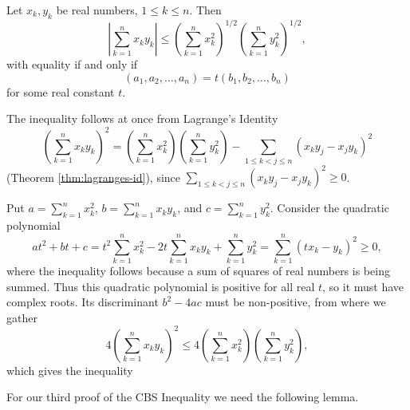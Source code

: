 \documentclass[11pt, openany]{book}
\theoremstyle{change} \theoremheaderfont{\blue\sffamily\bfseries}
\newcommand{\proofsymbol}{\Pisymbol{pzd}{113}}
\theoremstyle{nonumberplain} \theoremheaderfont{\sffamily\bfseries}
\newenvironment{f-pf}[0]{\itshape\begin{quote}{\bf First Proof: \ }}{\proofsymbol\end{quote}}
\newenvironment{s-pf}[0]{\itshape\begin{quote}{\bf Second Proof: \ }}{\proofsymbol\end{quote}}
\def\absval#1{\left| #1 \right|}
\newcommand{\dis}{\displaystyle}
\newcommand{\í}{\'{\i}}
\begin{document}
\begin{thm}\label{thm:CBS-ineq}
Let $x_k, y_k$ be real numbers, $1 \leq k \leq n$. Then
$$\absval{\sum _{k = 1} ^n x_ky_k} \leq \left(\sum _{k = 1} ^n x_k
^2 \right)^{1/2}\left(\sum _{k = 1} ^n y_k ^2 \right)^{1/2},   $$
with equality if and only if
$$(a_1,a_2,\ldots , a_n)=t(b_1,b_2,\ldots , b_n)
$$for some real constant $t$.
\end{thm}
\begin{f-pf}The inequality follows at once from Lagrange's Identity
$$ \left(\sum _{k=1} ^nx_ky_k\right)^2
=\left(\sum _{k=1} ^nx_k ^2\right)\left(\sum _{k=1} ^ny_k
^2\right)-\sum _{1\leq k <j\leq n}(x_ky_j-x_jy_k)^2$$ (Theorem
\ref{thm:lagranges-id}), since $\sum _{1\leq k <j\leq
n}(x_ky_j-x_jy_k)^2\geq 0$.
\end{f-pf}
\begin{s-pf}
Put $\dis{a = \sum _{k = 1} ^n x_k ^2}$, $\dis{b = \sum _{k = 1} ^n
x_ky_k }$, and $\dis{c = \sum _{k = 1} ^n y_k ^2}$. Consider the
quadratic polynomial
$$at^2 +
bt + c= t^2\sum _{k = 1} ^n x_k ^2 - 2t \sum _{k = 1} ^n x_ky_k +
\sum _{k = 1} ^n y_k ^2 = \sum _{k = 1} ^n (tx_k - y_k)^2  \geq 0,
$$ where the inequality follows because a sum of squares of real numbers is being summed. Thus this  quadratic polynomial is positive for all
real $t$, so it must have complex roots. Its discriminant $b^2 -
4ac$ must be non-positive, from where we gather
$$4\left(\sum _{k = 1} ^n x_ky_k\right)^2 \leq 4\left(\sum _{k = 1} ^n x_k
^2 \right)\left(\sum _{k = 1} ^n y_k ^2 \right),   $$which gives the
inequality
\end{s-pf}
For our third proof of the CBS Inequality we need the following
lemma.
\end{document}
